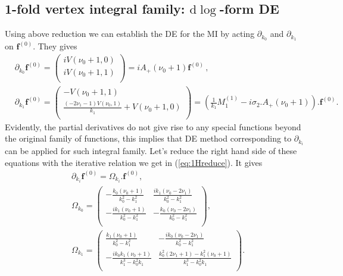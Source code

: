 \documentclass[a4paper,11pt]{article}
\newcommand{\nn}{\nonumber}
\newcommand{\nd}{\mathrm{d}}
\def\eqref#1{(\ref{#1})}
\begin{document}
\subsection{1-fold vertex integral family: $\nd\log$-form DE}  \label{sec:3.3}
Using above reduction we can establish the DE for the MI by acting 
 $\partial_{k_0}$ and $\partial_{k_1}$ on $\bm{f}^{(0)}$. They gives
\begin{align}
&\partial_{k_0}\bm{f}^{(0)}=\left(
\begin{array}{c}
 i V\left(\nu _0+1,0\right) \\
 i V\left(\nu _0+1,1\right) \\
\end{array}
\right) = i A_+(\nu_0+1)\bm{f}^{(0)} \,, \nn\\
&\partial_{k_1}\bm{f}^{(0)}=\left(
\begin{array}{c}
 -V\left(\nu _0+1,1\right) \\
 \frac{\left(-2 \nu _1-1\right) V\left(\nu _0,1\right)}{k_1}+V\left(\nu _0+1,0\right) \\
\end{array}
\right)=\left(\frac{1}{k_1}M^{(1)}_1-i  \sigma_2.A_+(\nu_0+1) \right).\bm{f}^{(0)}.
\end{align}
Evidently, the partial derivatives do not give rise to any special functions beyond the original family of functions, this implies that DE method corresponding to $\partial_{k_i}$ can be applied for such integral family.
Let's reduce the right hand side of these equations with the iterative relation we get in \eqref{eq:1Hreduce}. It gives
\begin{align}
&\partial_{k_i}\bm{f}^{(0)}= \Omega_{k_i}.\bm{f}^{(0)}, \nn\\
&\Omega_{k_0}=\left(
\begin{array}{cc}
 -\frac{k_0 \left(\nu _0+1\right)}{k_0^2-k_1^2} & 
 \frac{i k_1 \left(\nu _0-2 \nu _1\right)}{k_0^2-k_1^2} \\ -\frac{i k_1 \left(\nu _0+1\right)}{k_0^2-k_1^2} & -\frac{k_0 \left(\nu _0-2 \nu _1\right)}{k_0^2-k_1^2} \\
\end{array}
\right)  ,\nn\\
& \Omega_{k_1}=\left(
\begin{array}{cc}
 \frac{k_1 \left(\nu _0+1\right)}{k_0^2-k_1^2} &  
 -\frac{i k_0 \left(\nu _0-2 \nu _1\right)}{k_0^2-k_1^2} \\ -\frac{i k_0 k_1 \left(\nu _0+1\right)}{k_1^3-k_0^2 k_1} & \frac{k_0^2 \left(2 \nu _1+1\right)-k_1^2 \left(\nu _0+1\right)}{k_1^3-k_0^2
   k_1} \\
\end{array}
\right).
\end{align}
\end{document}
